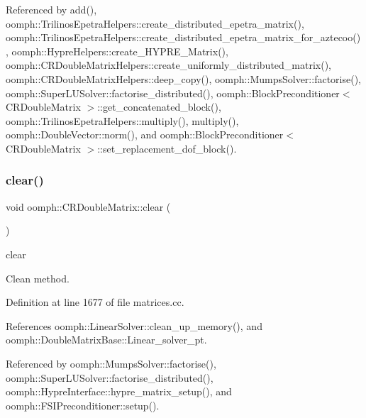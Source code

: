 Referenced by add(), oomph\+::\+Trilinos\+Epetra\+Helpers\+::create\+\_\+distributed\+\_\+epetra\+\_\+matrix(), oomph\+::\+Trilinos\+Epetra\+Helpers\+::create\+\_\+distributed\+\_\+epetra\+\_\+matrix\+\_\+for\+\_\+aztecoo(), oomph\+::\+Hypre\+Helpers\+::create\+\_\+\+H\+Y\+P\+R\+E\+\_\+\+Matrix(), oomph\+::\+C\+R\+Double\+Matrix\+Helpers\+::create\+\_\+uniformly\+\_\+distributed\+\_\+matrix(), oomph\+::\+C\+R\+Double\+Matrix\+Helpers\+::deep\+\_\+copy(), oomph\+::\+Mumps\+Solver\+::factorise(), oomph\+::\+Super\+L\+U\+Solver\+::factorise\+\_\+distributed(), oomph\+::\+Block\+Preconditioner$<$ C\+R\+Double\+Matrix $>$\+::get\+\_\+concatenated\+\_\+block(), oomph\+::\+Trilinos\+Epetra\+Helpers\+::multiply(), multiply(), oomph\+::\+Double\+Vector\+::norm(), and oomph\+::\+Block\+Preconditioner$<$ C\+R\+Double\+Matrix $>$\+::set\+\_\+replacement\+\_\+dof\+\_\+block().

\mbox{\label{classoomph_1_1CRDoubleMatrix_a70c8a67158c081e70b4d07a6b248bc7a}} 
\subsubsection{\texorpdfstring{clear()}{clear()}}
{\footnotesize\ttfamily void oomph\+::\+C\+R\+Double\+Matrix\+::clear (\begin{DoxyParamCaption}{ }\end{DoxyParamCaption})}



clear 

Clean method. 

Definition at line 1677 of file matrices.\+cc.



References oomph\+::\+Linear\+Solver\+::clean\+\_\+up\+\_\+memory(), and oomph\+::\+Double\+Matrix\+Base\+::\+Linear\+\_\+solver\+\_\+pt.



Referenced by oomph\+::\+Mumps\+Solver\+::factorise(), oomph\+::\+Super\+L\+U\+Solver\+::factorise\+\_\+distributed(), oomph\+::\+Hypre\+Interface\+::hypre\+\_\+matrix\+\_\+setup(), and oomph\+::\+F\+S\+I\+Preconditioner\+::setup().

\mbox{\label{classoomph_1_1CRDoubleMatrix_a21b3dbb8ee74e1247f80ce4506c395f8}} 
